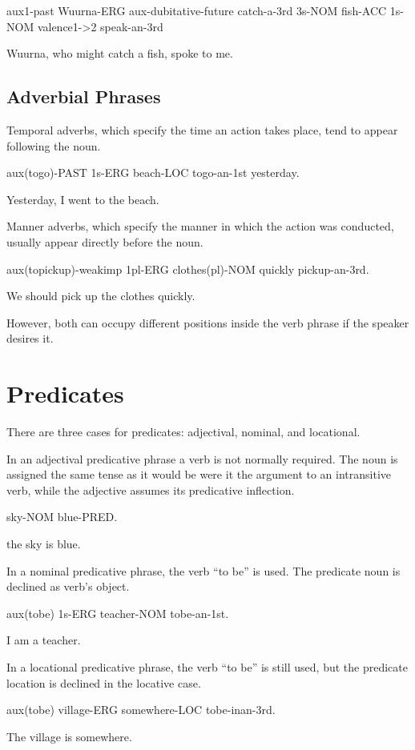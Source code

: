 aux1-past Wuurna-ERG aux-dubitative-future catch-a-3rd 3s-NOM fish-ACC 1s-NOM
valence1->2 speak-an-3rd

Wuurna, who might catch a fish, spoke to me.

\subsection{Adverbial Phrases}
\label{advsyntax}

Temporal adverbs, which specify the time an action takes place, tend to appear
following the noun.

aux(togo)-PAST 1s-ERG beach-LOC togo-an-1st yesterday.

Yesterday, I went to the beach.

Manner adverbs, which specify the manner in which the action was conducted,
usually appear directly before the noun.

aux(topickup)-weakimp 1pl-ERG clothes(pl)-NOM quickly pickup-an-3rd.

We should pick up the clothes quickly.

However, both can occupy different positions inside the verb phrase if the
speaker desires it.

\section{Predicates}

There are three cases for predicates: adjectival, nominal, and locational.

In an adjectival predicative phrase a verb is not normally required. The noun is
assigned the same tense as it would be were it the argument to an intransitive
verb, while the adjective assumes its predicative inflection.

sky-NOM blue-PRED.

the sky is blue.

In a nominal predicative phrase, the verb ``to be'' is used. The predicate noun
is declined as verb's object.

aux(tobe) 1s-ERG teacher-NOM tobe-an-1st.

I am a teacher.

In a locational predicative phrase, the verb ``to be'' is still used, but the
predicate location is declined in the locative case.

aux(tobe) village-ERG somewhere-LOC tobe-inan-3rd.

The village is somewhere.

